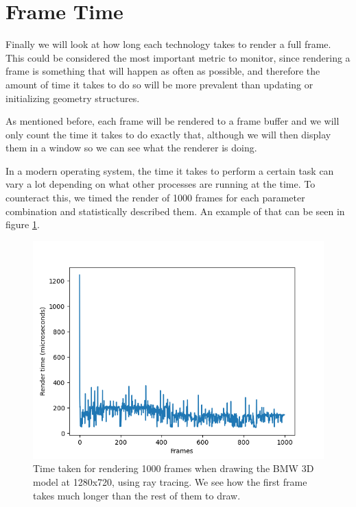 \section{Frame Time}
Finally we will look at how long each technology takes to render a full frame. This could be considered the most important metric to monitor, since rendering a frame is something that will happen as often as possible, and therefore the amount of time it takes to do so will be more prevalent than updating or initializing geometry structures.

As mentioned before, each frame will be rendered to a frame buffer and we will only count the time it takes to do exactly that, although we will then display them in a window so we can see what the renderer is doing.

In a modern operating system, the time it takes to perform a certain task can vary a lot depending on what other processes are running at the time. To counteract this, we timed the render of 1000 frames for each parameter combination and statistically described them. An example of that can be seen in figure \ref{frametimes-outlier-graph}.

\begin{figure}[hbt!]
    \centering
    \includegraphics[width=1.0\textwidth]{figuras/frametimes-outlier.png}
    \caption{Time taken for rendering 1000 frames when drawing the BMW 3D model at 1280x720, using ray tracing. We see how the first frame takes much longer than the rest of them to draw.}
    \label{frametimes-outlier-graph}
\end{figure}

